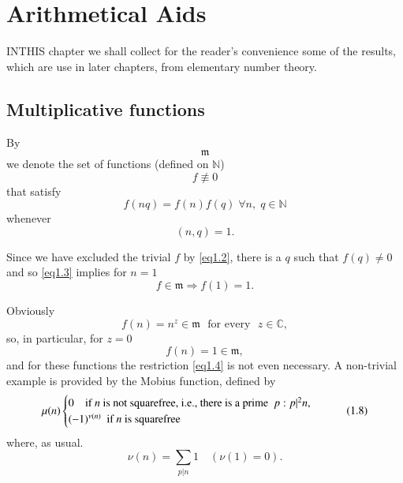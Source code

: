 
\chapter{Arithmetical Aids}\label{chap1}%

IN\pageoriginale THIS chapter we shall collect for the reader's
convenience some of the results, which are use in later chapters, from
elementary number theory.  

\section{Multiplicative functions}\label{chap1-sec1}

By 
\begin{equation*}
\mathfrak{m} \tag{1.1}\label{eq1.1}
\end{equation*}
we denote the set of functions (defined on $\mathbb{N}$) 
\begin{equation*}%
f\nequiv 0 \tag{1.2}\label{eq1.2}
\end{equation*}
that satisfy 
\begin{equation*}%
f(nq)=f(n)f(q) \; \forall  n, \; q \in \mathbb{N} \tag{1.3}\label{eq1.3}
\end{equation*}
whenever
\begin{equation*}%
(n,q)=1. \tag{1.4}\label{eq1.4}
\end{equation*}

Since we have excluded the trivial $f$ by \eqref{eq1.2}, there is a $q$ such
that $f(q)\neq 0$ and so \eqref{eq1.3} implies for $n=1$ 
\begin{equation*} %
f \in \mathfrak{m}\Longrightarrow f(1) =1. \tag{1.5}\label{eq1.5}
\end{equation*}

Obviously
\begin{equation*}%
f(n)= n^z \in \mathfrak{m} \text{~ for every~ } z\in \mathbb{C},
\tag{1.6}\label{eq1.6} 
\end{equation*}
so, in particular, for $z=0$
\begin{equation*}%
f(n)=1 \in \mathfrak{m}, \tag{1.7}\label{eq1.7}
\end{equation*}
and for these functions the restriction \eqref{eq1.4} is not even
necessary. A non-trivial example is provided by the Mobius function,
defined by  
\begin{equation*}%
\mu (n)
\begin{cases}
0 \text{~ \; if $n$ is not squarefree, i.e., there is a prime~ }
 p:p|^2n,\\
(-1)^{\nu(n)} \text{~ if $n$ is squarefree}
\end{cases} \tag{1.8}\label{eq1.8}
\end{equation*}\pageoriginale
where, as usual. 
\begin{equation*}%
\nu(n)=\sum_{p|n}1  \quad (\nu(1)=0). \tag{1.9}\label{eq1.9}
\end{equation*}

